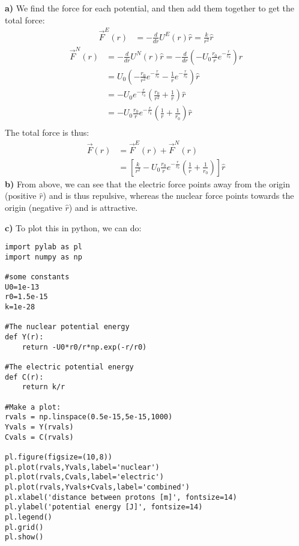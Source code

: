 \begin{solution}
\textbf{a)} We find the force for each potential, and then add them together to get the total force:
\begin{align*}
\vec F^E(r)&=-\frac{d}{dr}U^E(r)\hat r=\frac{k}{r^2}\hat r
\end{align*}
\begin{align*}
\vec F^N(r)&=-\frac{d}{dr}U^N(r)\hat r=-\frac{d}{dr}\left(-U_0\frac{r_0}{r}e^{-\frac{r}{r_0}}\right)\hat r\\
&=U_0\left( -\frac{r_0}{r^2}e^{-\frac{r}{r_0}}- \frac{1}{r}e^{-\frac{r}{r_0}}\right)\hat r\\
&=-U_0e^{-\frac{r}{r_0}}\left(\frac{r_0}{r^2} + \frac{1}{r}\right)\hat r\\
&=-U_0\frac{r_0}{r}e^{-\frac{r}{r_0}}\left(\frac{1}{r} + \frac{1}{r_0}\right)\hat r\\
\end{align*}
The total force is thus:
\begin{align*}
\vec F(r)&=\vec F^E(r)+\vec F^N(r)\\
&=\left[\frac{k}{r^2}-U_0\frac{r_0}{r}e^{-\frac{r}{r_0}}\left(\frac{1}{r} + \frac{1}{r_0}\right) \right] \hat r
\end{align*}
\textbf{b)} From above, we can see that the electric force points away from the origin (positive $\hat r$) and is thus repulsive, whereas the nuclear force points towards the origin (negative $\hat r$) and is attractive.

\textbf{c)} To plot this in python, we can do:
\begin{verbatim}
import pylab as pl
import numpy as np

#some constants
U0=1e-13
r0=1.5e-15
k=1e-28

#The nuclear potential energy
def Y(r):
    return -U0*r0/r*np.exp(-r/r0)

#The electric potential energy
def C(r):
    return k/r
 
#Make a plot:
rvals = np.linspace(0.5e-15,5e-15,1000)
Yvals = Y(rvals)
Cvals = C(rvals)

pl.figure(figsize=(10,8))
pl.plot(rvals,Yvals,label='nuclear')
pl.plot(rvals,Cvals,label='electric')
pl.plot(rvals,Yvals+Cvals,label='combined')
pl.xlabel('distance between protons [m]', fontsize=14)
pl.ylabel('potential energy [J]', fontsize=14)
pl.legend()
pl.grid()
pl.show()
\end{verbatim}




\end{solution}
